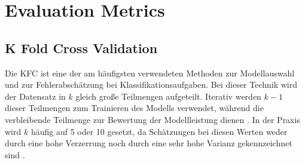 
\section{Evaluation Metrics}
\subsection{K Fold Cross Validation}

Die \acrfull{KFC} ist eine der am häufigsten verwendeten Methoden zur Modellauswahl und zur Fehlerabschätzung bei Klassifikationsaufgaben. Bei dieser Technik wird der Datensatz in $k$ gleich große Teilmengen aufgeteilt. Iterativ werden $k-1$ dieser Teilmengen zum Trainieren des Modells verwendet, während die verbleibende Teilmenge zur Bewertung der Modellleistung dienen \cite{Anguita2012}. In der Praxis wird $k$ häufig auf 5 oder 10 gesetzt, da Schätzungen bei diesen Werten weder durch eine hohe Verzerrung noch durch eine sehr hohe Varianz gekennzeichnet sind \cite{Nti2021}. 

